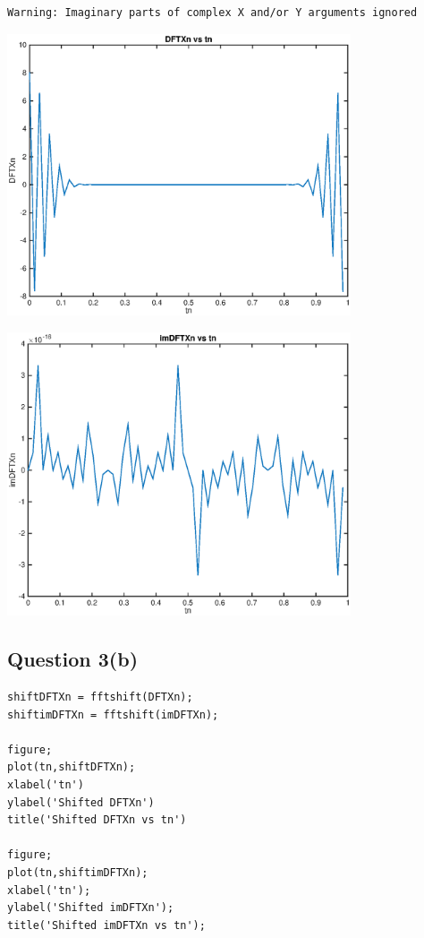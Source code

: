 \documentclass{article}
\begin{document}
        \color{lightgray} \begin{verbatim}Warning: Imaginary parts of complex X and/or Y arguments ignored 
\end{verbatim} \color{black}
    
\includegraphics [width=4in]{untitled_02.eps}

\includegraphics [width=4in]{untitled_03.eps}


\subsection*{Question 3(b)}

\begin{verbatim}
shiftDFTXn = fftshift(DFTXn);
shiftimDFTXn = fftshift(imDFTXn);

figure;
plot(tn,shiftDFTXn);
xlabel('tn')
ylabel('Shifted DFTXn')
title('Shifted DFTXn vs tn')

figure;
plot(tn,shiftimDFTXn);
xlabel('tn');
ylabel('Shifted imDFTXn');
title('Shifted imDFTXn vs tn');
\end{verbatim}
\end{document}
